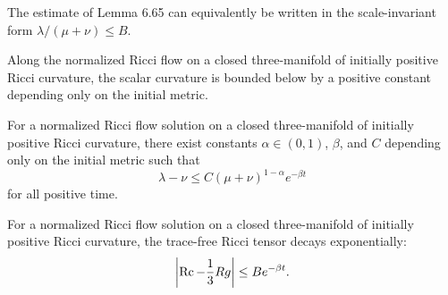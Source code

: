 \begin{remark}
\label{ch06-rem-scale-invariant-pinching}
The estimate of Lemma 6.65 can equivalently be written in the scale-invariant form \(\lambda/(\mu+\nu)\le B\).
\end{remark}

\begin{lemma}
\label{ch06-lem-uniform-positive-scalar-lower-bound}
Along the normalized Ricci flow on a closed three-manifold of initially positive Ricci curvature, the scalar curvature is bounded below by a positive constant depending only on the initial metric.
\end{lemma}

\begin{proposition}
\label{ch06-prop-exponential-pinching-sectional-curvature}
For a normalized Ricci flow solution on a closed three-manifold of initially positive Ricci curvature, there exist constants \(\alpha\in(0,1)\), \(\beta\), and \(C\) depending only on the initial metric such that
\[
\lambda-\nu\le C(\mu+\nu)^{1-\alpha}e^{-\beta t}
\]
for all positive time.
\end{proposition}

\begin{corollary}
\label{ch06-cor-exponential-decay-tracefree-ricci}
For a normalized Ricci flow solution on a closed three-manifold of initially positive Ricci curvature, the trace-free Ricci tensor decays exponentially:
\[
\left|\operatorname{Rc}-\frac13 Rg\right| \le Be^{-\beta t}.
\]
\end{corollary}
